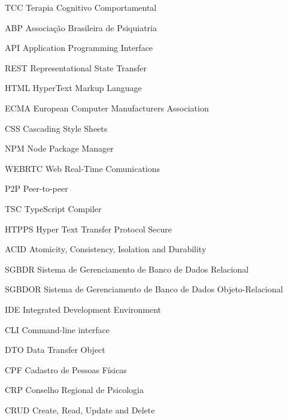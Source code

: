 \begin{siglas}
    \item[TCC] Terapia Cognitivo Comportamental
    \item[ABP] Associação Brasileira de Psiquiatria 
    \item[API] Application Programming Interface
    \item[REST] Representational State Transfer
    \item[HTML] HyperText Markup Language
    \item[ECMA] European Computer Manufacturers Association
    \item[CSS] Cascading Style Sheets 
    \item[NPM] Node Package Manager
    \item[WEBRTC] Web Real-Time Comunications
    \item[P2P] Peer-to-peer
    \item[TSC] TypeScript Compiler
    \item[HTPPS] Hyper Text Transfer Protocol Secure
    \item[ACID] Atomicity, Consistency, Isolation and Durability
    \item[SGBDR] Sistema de Gerenciamento de Banco de Dados Relacional   
    \item[SGBDOR] Sistema de Gerenciamento de Banco de Dados Objeto-Relacional  
    \item[IDE] Integrated Development Environment
    \item[CLI] Command-line interface 
    \item[DTO] Data Transfer Object 
    \item[CPF] Cadastro de Pessoas Físicas
    \item[CRP] Conselho Regional de Psicologia 
    \item[CRUD] Create, Read, Update and Delete
\end{siglas}
